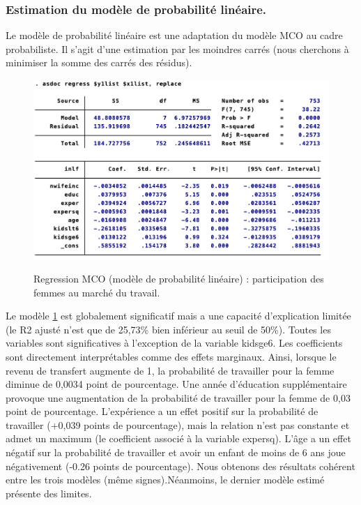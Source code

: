  \subsubsection*{Estimation du modèle de probabilité linéaire.}

 Le modèle de probabilité linéaire est une adaptation du modèle MCO au cadre probabiliste. Il s’agit d’une estimation par les moindres carrés (nous cherchons à minimiser la somme des carrés des résidus). 

\begin{figure}[h]
    \caption{Regression MCO (modèle de probabilité linéaire) : participation des femmes au marché du travail.}
    \includegraphics[scale = 0.8]{100_tab_results/probalineaire.png}
    \centering
    \label{reg:linearProba}
\end{figure}


 Le modèle \ref{reg:linearProba} est globalement significatif mais a une capacité d’explication limitée (le R2 ajusté n’est que de 25,73\% bien inférieur au seuil de 50\%). Toutes les variables sont significatives à l’exception de la variable kidsge6. Les coefficients sont directement interprétables comme des effets marginaux. Ainsi, lorsque le revenu de transfert augmente de 1, la probabilité de travailler pour la femme diminue de 0,0034 point de pourcentage. Une année d’éducation supplémentaire provoque une augmentation de la probabilité de travailler pour la femme de 0,03 point de pourcentage. L’expérience a un effet positif sur la probabilité de travailler (+0,039 points de pourcentage), mais la relation n’est pas constante et admet un maximum (le coefficient associé à la variable expersq). L’âge a un effet négatif sur la probabilité de travailler et avoir un enfant de moins de 6 ans joue négativement (-0.26 points de pourcentage).
Nous obtenons des résultats cohérent entre les trois modèles (même signes).Néanmoins, le dernier modèle estimé présente des limites.


